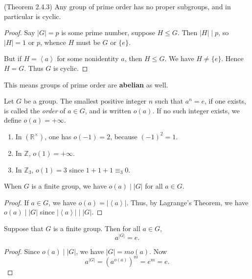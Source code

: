 
\begin{corollary}
	(Theorem 2.4.3) Any group of prime order has no proper subgroups, and in particular is cyclic.
\end{corollary}
\begin{proof}
	Say $|G| = p$ is some prime number, suppose $H\le G$. Then $|H| \mid p$, so $|H| = 1$ or $p$, whence $H$ must be $G$ or $\{e\} $.

	But if $H = \left\langle a \right\rangle $ for some nonidentity $a$, then $H \le G$. We have $H \neq \{e\} $. Hence $H = G$. Thus $G$ is cyclic.
\end{proof}
\begin{remark}
	This means groups of prime order are \textbf{abelian} as well.
\end{remark}

\begin{definition}
	Let $G$ be a group. The smallest positive integer $n$ such that $a^n = e$, if one exists, is called the \textit{order} of $a \in G$, and is written $o(a)$. If no such integer exists, we define $o(a) = +\infty $.
\end{definition}

\begin{example}
	\begin{enumerate}
		\item In $\left( \mathbb{R}^\times  \right) $, one has $o(-1) = 2$, because $(-1)^{2} = 1$.
		\item In $\mathbb{Z}$, $o(1) = +\infty$.
		\item In $\mathbb{Z}_3$, $o(1) = 3$ since $1+1+1 \equiv_3 0$.
	\end{enumerate}
\end{example}

\begin{theorem}
	When $G$ is a finite group, we have $o(a) \mid |G|$ for all $a \in G$.
\end{theorem}
\begin{proof}
If $a \in G$, we have $o(a) = |\left\langle a \right\rangle |$. Thus, by Lagrange's Theorem, we have $o(a) \mid |G|$ since $|\left\langle a \right\rangle | \mid |G|$.
\end{proof}

\begin{corollary}
	Suppose that  $G$ is a finite group. Then for all $a \in G$, \[
		a^{|G|} = e
	.\] 
\end{corollary}
\begin{proof}
	Since $o(a) \mid |G|$, we have $|G| = m o(a)$. Now \[
		a^{|G|} = \left( a^{o(a)} \right) ^{m} = e^{m} = e
	.\] 
\end{proof}

